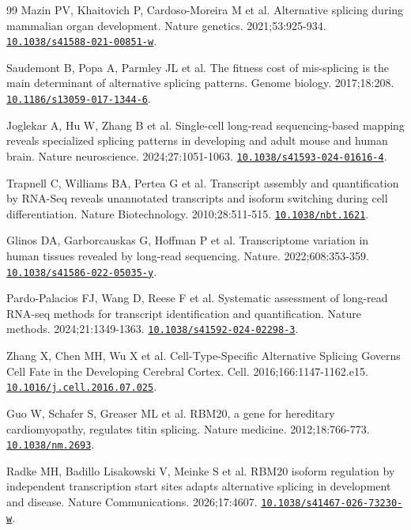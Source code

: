 \documentclass[11pt,a4paper]{article}
\begin{document}
\begin{thebibliography}{99}
Mazin PV, Khaitovich P, Cardoso-Moreira M et al. Alternative splicing during mammalian organ development. Nature genetics. 2021;53:925-934. \href{https://doi.org/10.1038/s41588-021-00851-w}{\nolinkurl{10.1038/s41588-021-00851-w}}.

Saudemont B, Popa A, Parmley JL et al. The fitness cost of mis-splicing is the main determinant of alternative splicing patterns. Genome biology. 2017;18:208. \href{https://doi.org/10.1186/s13059-017-1344-6}{\nolinkurl{10.1186/s13059-017-1344-6}}.

Joglekar A, Hu W, Zhang B et al. Single-cell long-read sequencing-based mapping reveals specialized splicing patterns in developing and adult mouse and human brain. Nature neuroscience. 2024;27:1051-1063. \href{https://doi.org/10.1038/s41593-024-01616-4}{\nolinkurl{10.1038/s41593-024-01616-4}}.

Trapnell C, Williams BA, Pertea G et al. Transcript assembly and quantification by RNA-Seq reveals unannotated transcripts and isoform switching during cell differentiation. Nature Biotechnology. 2010;28:511-515. \href{https://doi.org/10.1038/nbt.1621}{\nolinkurl{10.1038/nbt.1621}}.

Glinos DA, Garborcauskas G, Hoffman P et al. Transcriptome variation in human tissues revealed by long-read sequencing. Nature. 2022;608:353-359. \href{https://doi.org/10.1038/s41586-022-05035-y}{\nolinkurl{10.1038/s41586-022-05035-y}}.

Pardo-Palacios FJ, Wang D, Reese F et al. Systematic assessment of long-read RNA-seq methods for transcript identification and quantification. Nature methods. 2024;21:1349-1363. \href{https://doi.org/10.1038/s41592-024-02298-3}{\nolinkurl{10.1038/s41592-024-02298-3}}.

Zhang X, Chen MH, Wu X et al. Cell-Type-Specific Alternative Splicing Governs Cell Fate in the Developing Cerebral Cortex. Cell. 2016;166:1147-1162.e15. \href{https://doi.org/10.1016/j.cell.2016.07.025}{\nolinkurl{10.1016/j.cell.2016.07.025}}.

Guo W, Schafer S, Greaser ML et al. RBM20, a gene for hereditary cardiomyopathy, regulates titin splicing. Nature medicine. 2012;18:766-773. \href{https://doi.org/10.1038/nm.2693}{\nolinkurl{10.1038/nm.2693}}.

Radke MH, Badillo Lisakowski V, Meinke S et al. RBM20 isoform regulation by independent transcription start sites adapts alternative splicing in development and disease. Nature Communications. 2026;17:4607. \href{https://doi.org/10.1038/s41467-026-73230-w}{\nolinkurl{10.1038/s41467-026-73230-w}}.


\end{thebibliography}
\end{document}
